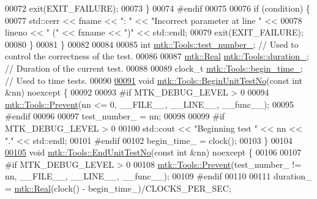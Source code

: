 \begin{DoxyCode}
00072     exit(EXIT\_FAILURE);
00073   \}
00074 \textcolor{preprocessor}{  #endif}
00075 
00076   \textcolor{keywordflow}{if} (condition) \{
00077     std::cerr << fname << \textcolor{stringliteral}{": "} << \textcolor{stringliteral}{"Incorrect parameter at line "} <<
00078     lineno << \textcolor{stringliteral}{" ("} << fxname << \textcolor{stringliteral}{")"} << std::endl;
00079     exit(EXIT\_FAILURE);
00080   \}
00081 \}
00082 
00084 
00085 \textcolor{keywordtype}{int} \hyperlink{classmtk_1_1Tools_a04a60458594336ee1badff79b8a9a77f}{mtk::Tools::test\_number\_};  \textcolor{comment}{// Used to control the correctness of the test.}
00086 
00087 \hyperlink{group__c01-roots_gac080bbbf5cbb5502c9f00405f894857d}{mtk::Real} \hyperlink{classmtk_1_1Tools_aba9d3d2952a3de9e7b46faa86d28d692}{mtk::Tools::duration\_};  \textcolor{comment}{// Duration of the current test.}
00088 
00089 clock\_t \hyperlink{classmtk_1_1Tools_a4bd58d08397db42271ed9e2d3ecc9963}{mtk::Tools::begin\_time\_};  \textcolor{comment}{// Used to time tests.}
00090 
\hypertarget{mtk__tools_8cc_source_l00091}{}\hyperlink{classmtk_1_1Tools_afc29ecaf337a13ed2e817d3890a5a441}{00091} \textcolor{keywordtype}{void} \hyperlink{classmtk_1_1Tools_afc29ecaf337a13ed2e817d3890a5a441}{mtk::Tools::BeginUnitTestNo}(\textcolor{keyword}{const} \textcolor{keywordtype}{int} &nn) noexcept \{
00092 
00093 \textcolor{preprocessor}{  #if MTK\_DEBUG\_LEVEL > 0}
00094   \hyperlink{classmtk_1_1Tools_a332324c6f25e66be9dff48c5987a3b9f}{mtk::Tools::Prevent}(nn <= 0, \_\_FILE\_\_, \_\_LINE\_\_, \_\_func\_\_);
00095 \textcolor{preprocessor}{  #endif}
00096 
00097   test\_number\_ = nn;
00098 
00099 \textcolor{preprocessor}{  #if MTK\_DEBUG\_LEVEL > 0}
00100   std::cout << \textcolor{stringliteral}{"Beginning test "} << nn << \textcolor{stringliteral}{"."} << std::endl;
00101 \textcolor{preprocessor}{  #endif}
00102   begin\_time\_ = clock();
00103 \}
00104 
\hypertarget{mtk__tools_8cc_source_l00105}{}\hyperlink{classmtk_1_1Tools_aba67d9dc35c9c1c49430fcc9ea035e03}{00105} \textcolor{keywordtype}{void} \hyperlink{classmtk_1_1Tools_aba67d9dc35c9c1c49430fcc9ea035e03}{mtk::Tools::EndUnitTestNo}(\textcolor{keyword}{const} \textcolor{keywordtype}{int} &nn) noexcept \{
00106 
00107 \textcolor{preprocessor}{  #if MTK\_DEBUG\_LEVEL > 0}
00108   \hyperlink{classmtk_1_1Tools_a332324c6f25e66be9dff48c5987a3b9f}{mtk::Tools::Prevent}(test\_number\_ != nn, \_\_FILE\_\_, \_\_LINE\_\_, \_\_func\_\_);
00109 \textcolor{preprocessor}{  #endif}
00110 
00111   duration\_ = \hyperlink{group__c01-roots_gac080bbbf5cbb5502c9f00405f894857d}{mtk::Real}(clock() - begin\_time\_)/CLOCKS\_PER\_SEC;

\end{DoxyCode}
